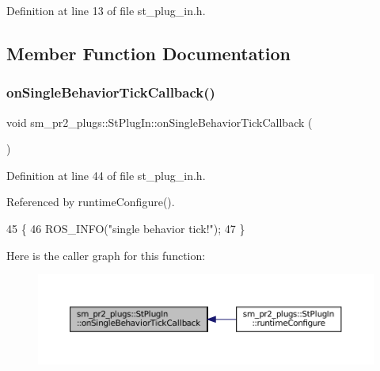 Definition at line 13 of file st\+\_\+plug\+\_\+in.\+h.



\subsection{Member Function Documentation}
\mbox{\label{structsm__pr2__plugs_1_1StPlugIn_a6206766ae01ea5ee0effe3f574245176}} 
\subsubsection{\texorpdfstring{on\+Single\+Behavior\+Tick\+Callback()}{onSingleBehaviorTickCallback()}}
{\footnotesize\ttfamily void sm\+\_\+pr2\+\_\+plugs\+::\+St\+Plug\+In\+::on\+Single\+Behavior\+Tick\+Callback (\begin{DoxyParamCaption}{ }\end{DoxyParamCaption})\hspace{0.3cm}{\ttfamily [inline]}}



Definition at line 44 of file st\+\_\+plug\+\_\+in.\+h.



Referenced by runtime\+Configure().


\begin{DoxyCode}
45     \{
46         ROS\_INFO(\textcolor{stringliteral}{"single behavior tick!"});
47     \}
\end{DoxyCode}
Here is the caller graph for this function\+:
\nopagebreak
\begin{figure}[H]
\begin{center}
\leavevmode
\includegraphics[width=350pt]{structsm__pr2__plugs_1_1StPlugIn_a6206766ae01ea5ee0effe3f574245176_icgraph}
\end{center}
\end{figure}
\mbox{\label{structsm__pr2__plugs_1_1StPlugIn_a1748462c4026a2df5be52e38a429560b}} 
